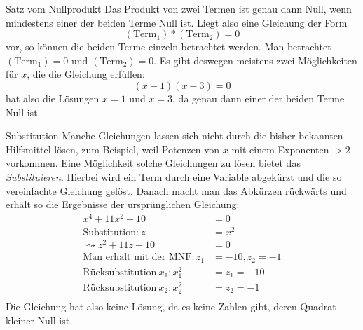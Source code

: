 \begin{bla}{Satz vom Nullprodukt}
  Das Produkt von zwei Termen ist genau dann Null, wenn mindestens einer der beiden Terme Null ist.
  Liegt also eine Gleichung der Form
  \begin{equation*}
    (\text{Term}_1)*(\text{Term}_2)=0
    \end{equation*}
  vor, so können die beiden Terme einzeln betrachtet werden. Man betrachtet $(\text{Term}_1)=0$ und $(\text{Term}_2)=0$. Es gibt deswegen meistens zwei Möglichkeiten für $x$, die die Gleichung erfüllen:
  \begin{equation*}
    (x-1)(x-3) = 0
  \end{equation*}
  hat also die Lösungen $x=1$ und $x=3$, da genau dann einer der beiden Terme Null ist.
\end{bla}

\begin{bla}{Substitution}
  Manche Gleichungen lassen sich nicht durch die bisher bekannten Hilfsmittel lösen, zum Beispiel, weil Potenzen von $x$ mit einem Exponenten $>2$ vorkommen. Eine Möglichkeit solche Gleichungen zu lösen bietet das \emph{Substituieren}. Hierbei wird ein Term durch eine Variable abgekürzt und die
  so vereinfachte Gleichung gelöst. Danach macht man das Abkürzen rückwärts und erhält so die Ergebnisse der ursprünglichen Gleichung:
  \begin{align*}
    x^4+11x^2+10 & = 0 \\
    \text{Substitution:}\ z & = x^2 \\
    \rightsquigarrow z^2+11z+10 & = 0 \\
    \text{Man erhält mit der MNF}: z_1 & = -10, z_2=-1 \\
    \text{Rücksubstitution}\ x_1: x_1^2 & = z_1=-10 \\
    \text{Rücksubstitution}\ x_2: x_2^2 & = z_2=-1 \\
  \end{align*}
  Die Gleichung hat also keine Lösung, da es keine Zahlen gibt, deren Quadrat kleiner Null ist.
\end{bla}
